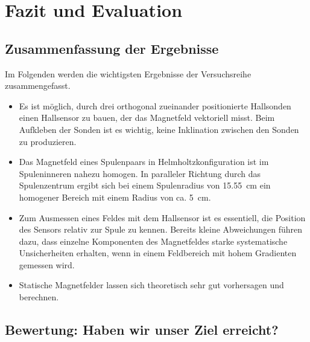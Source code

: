 \documentclass[12pt,a4paper]{article}
\begin{document}
\section{Fazit und Evaluation}
\subsection{Zusammenfassung der Ergebnisse}
Im Folgenden werden die wichtigsten Ergebnisse der Versuchsreihe zusammengefasst.
\begin{itemize}
	\item Es ist möglich, durch drei orthogonal zueinander positionierte Hallsonden einen Hallsensor zu bauen, der das Magnetfeld vektoriell misst. Beim Aufkleben der Sonden ist es wichtig, keine Inklination zwischen den Sonden zu produzieren.
	\item Das Magnetfeld eines Spulenpaars in Helmholtzkonfiguration ist im Spuleninneren nahezu homogen. In paralleler Richtung durch das Spulenzentrum ergibt sich bei einem Spulenradius von \SI{15.55}{cm} ein homogener Bereich mit einem Radius von ca. \SI{5}{cm}.
	\item Zum Ausmessen eines Feldes mit dem Hallsensor ist es essentiell, die Position des Sensors relativ zur Spule zu kennen. Bereits kleine Abweichungen führen dazu, dass einzelne Komponenten des Magnetfeldes starke systematische Unsicherheiten erhalten, wenn in einem Feldbereich mit hohem Gradienten gemessen wird.
	\item Statische Magnetfelder lassen sich theoretisch sehr gut vorhersagen und berechnen.
\end{itemize}
\subsection{Bewertung: Haben wir unser Ziel erreicht?}
\newpage
\end{document}
